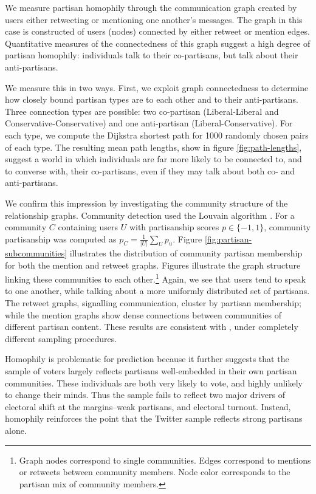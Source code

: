 \documentclass{article}
\begin{document}
We measure partisan homophily through the communication graph created
by users either retweeting or mentioning one another's messages. The
graph in this case is constructed of users (nodes) connected by either
retweet or mention edges. Quantitative measures of the connectedness
of this graph suggest a high degree of partisan homophily: individuals
talk to their co-partisans, but talk about their anti-partisans.

We measure this in two ways. First, we exploit graph connectedness to
determine how closely bound partisan types are to each other and to
their anti-partisans. Three connection types are possible: two
co-partisan (Liberal-Liberal and Conservative-Conservative) and one
anti-partisan (Liberal-Conservative). For each type, we compute the
Dijkstra shortest path for 1000 randomly chosen pairs of each
type. The resulting mean path lengths, show in figure
\ref{fig:path-lengths}, suggest a world in which individuals are far
more likely to be connected to, and to converse with, their
co-partisans, even if they may talk about both co- and anti-partisans.

We confirm this impression by investigating the community structure of
the relationship graphs. Community detection used the Louvain
algorithm \citep{blondel2008fast}. For a community $C$ containing
users $U$ with partisanship scores $p \in \{-1, 1\}$, community partisanship was computed
as $p_C = \frac{1}{\left|U\right|}\sum_U p_u$. Figure
\ref{fig:partisan-subcommunities} 
illustrates the distribution of community partisan membership
for both the mention and retweet graphs. Figures
 illustrate the graph
structure linking these communities to each other.\footnote{Graph
  nodes correspond to single communities. Edges correspond to mentions
or retweets between community members. Node color corresponds to the
partisan mix of community members.} Again, we see that users tend
to speak to one another, while talking about a more uniformly
distributed set of partisans. The retweet graphs, signalling
communication, cluster by partisan membership; while the mention
graphs show dense connections between communities of different
partisan content. These results are consistent with
\cite{conover2011}, under completely different sampling procedures. 

Homophily is problematic for prediction because it further suggests
that the sample of voters largely reflects partisans well-embedded in
their own partisan communities. These individuals are both very likely
to vote, and highly unlikely to change their minds. Thus the sample
fails to reflect two major drivers of electoral shift at the
margins--weak partisans, and electoral turnout. Instead, homophily
reinforces the point that the Twitter sample reflects strong partisans alone.
\end{document}
